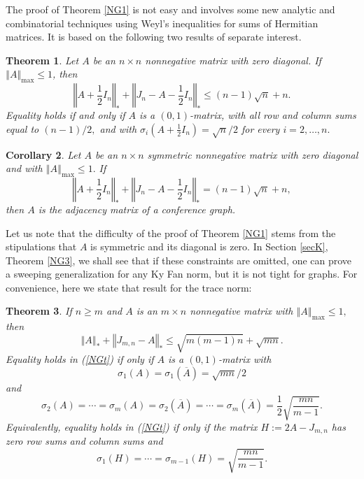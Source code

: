 \documentclass[12pt]{article}%
\newtheorem{theorem}{Theorem}[section]
\newtheorem{corollary}[theorem]{Corollary}
\begin{document}
The proof of Theorem \ref{NG1} is not easy and involves some new analytic and
combinatorial techniques using Weyl's inequalities for sums of Hermitian
matrices. It is based on the following two results of separate interest.

\begin{theorem}
\label{NG2}Let $A$ be an $n\times n$ nonnegative matrix with zero diagonal. If
$\left\Vert A\right\Vert _{\max}\leq1$, then
\begin{equation}
\left\Vert A+\frac{1}{2}I_{n}\right\Vert _{\ast}+\left\Vert J_{n}-A-\frac
{1}{2}I_{n}\right\Vert _{\ast}\leq(n-1)\sqrt{n}+n. \label{th2in}%
\end{equation}
Equality holds if and only if $A$ is a $\left(  0,1\right)  $-matrix, with all
row and column sums equal to $\left(  n-1\right)  /2,$ and with $\sigma
_{i}\left(  A+\frac{1}{2}I_{n}\right)  =\sqrt{n}/2$ for every $i=2,\ldots,n.$
\end{theorem}

\begin{corollary}
\label{cor2}Let $A$ be an $n\times n$ symmetric nonnegative matrix with zero
diagonal and with $\left\Vert A\right\Vert _{\max}\leq1.$ If
\begin{equation}
\left\Vert A+\frac{1}{2}I_{n}\right\Vert _{\ast}+\left\Vert J_{n}-A-\frac
{1}{2}I_{n}\right\Vert _{\ast}=(n-1)\sqrt{n}+n, \label{cor2in}%
\end{equation}
then $A$ is the adjacency matrix of a conference graph.
\end{corollary}

Let us note that the difficulty of the proof of Theorem \ref{NG1} stems from
the stipulations that $A$ is symmetric and its diagonal is zero. In Section
\ref{secK}, Theorem \ref{NG3}, we shall see that if these constraints are
omitted, one can prove a sweeping generalization for any Ky Fan norm, but it
is not tight for graphs. For convenience, here we state that result for the
trace norm:

\begin{theorem}
\label{NGtt}If $n\geq m$ and $A$ is an $m\times n$ nonnegative matrix with
$\left\Vert A\right\Vert _{\max}\leq1,$ then
\begin{equation}
\left\Vert A\right\Vert _{\ast}+\left\Vert J_{m,n}-A\right\Vert _{\ast}%
\leq\sqrt{m\left(  m-1\right)  n}+\sqrt{mn}. \label{NGt}%
\end{equation}
Equality holds in (\ref{NGt}) if only if $A$ is a $\left(  0,1\right)
$-matrix with
\[
\sigma_{1}(A)=\sigma_{1}(\overline{A})=\sqrt{mn}/2
\]
and
\[
\sigma_{2}(A)=\cdots=\sigma_{m}(A)=\sigma_{2}(\overline{A})=\cdots=\sigma
_{m}(\overline{A})=\frac{1}{2}\sqrt{\frac{mn}{m-1}}.
\]
Equivalently, equality holds in (\ref{NGt}) if only if the matrix
$H:=2A-J_{m,n}$ has zero row sums and column sums and
\[
\sigma_{1}(H)=\cdots=\sigma_{m-1}(H)=\sqrt{\frac{mn}{m-1}}.
\]

\end{theorem}
\end{document}
